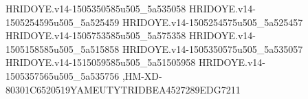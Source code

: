 HRIDOYE.v14-1505350585u505_5a535058
HRIDOYE.v14-1505254595u505_5a525459
HRIDOYE.v14-1505254575u505_5a525457
HRIDOYE.v14-1505753585u505_5a575358
HRIDOYE.v14-1505158585u505_5a515858
HRIDOYE.v14-1505350575u505_5a535057
HRIDOYE.v14-1515059585u505_5a51505958
HRIDOYE.v14-1505357565u505_5a535756
,HM-XD-80301C6520519YAMEUTYTRIDBEA4527289EDG7211
